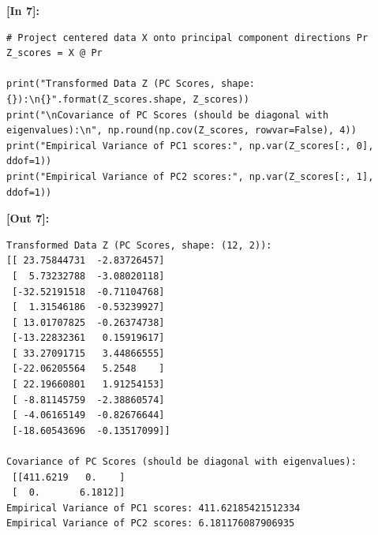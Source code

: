 \vspace{0.6em}
\noindent\textbf{\small [In 7]:}
\begin{lstlisting}[style=pycode]
# Project centered data X onto principal component directions Pr
Z_scores = X @ Pr

print("Transformed Data Z (PC Scores, shape: {}):\n{}".format(Z_scores.shape, Z_scores))
print("\nCovariance of PC Scores (should be diagonal with eigenvalues):\n", np.round(np.cov(Z_scores, rowvar=False), 4))
print("Empirical Variance of PC1 scores:", np.var(Z_scores[:, 0], ddof=1))
print("Empirical Variance of PC2 scores:", np.var(Z_scores[:, 1], ddof=1))
\end{lstlisting}
\noindent\textbf{\small [Out 7]:}
\begin{lstlisting}[style=output]
Transformed Data Z (PC Scores, shape: (12, 2)):
[[ 23.75844731  -2.83726457]
 [  5.73232788  -3.08020118]
 [-32.52191518  -0.71104768]
 [  1.31546186  -0.53239927]
 [ 13.01707825  -0.26374738]
 [-13.22832361   0.15919617]
 [ 33.27091715   3.44866555]
 [-22.06205564   5.2548    ]
 [ 22.19660801   1.91254153]
 [ -8.81145759  -2.38860574]
 [ -4.06165149  -0.82676644]
 [-18.60543696  -0.13517099]]

Covariance of PC Scores (should be diagonal with eigenvalues):
 [[411.6219   0.    ]
 [  0.       6.1812]]
Empirical Variance of PC1 scores: 411.62185421512334
Empirical Variance of PC2 scores: 6.181176087906935
\end{lstlisting}


